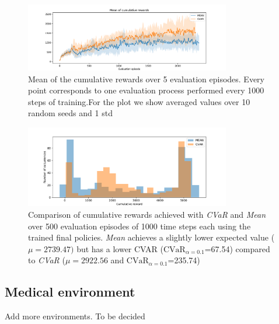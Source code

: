 \begin{figure}[ht]
\centering
\includegraphics[width=0.8\textwidth]{images/Walker_offpolicy_expert/mean_train_withstds.pdf}
\caption{Mean of the cumulative rewards over 5 evaluation episodes. Every point corresponds
to one evaluation process performed every 1000 steps of training.For the plot we
show averaged values over 10 random seeds and 1 std}
\label{fig:mean_walker}

\end{figure}



\begin{figure}[ht]
\centering
\includegraphics[width=0.8\textwidth]{images/Walker_offpolicy_expert/hist_evaluation_numevalsteps1000.pdf}
\caption{Comparison of cumulative rewards achieved with \textit{CVaR} and \textit{Mean}
over 500 evaluation episodes of 1000 time steps each using the trained final policies.
\textit{Mean} achieves a slightly lower expected value ($\mu=2739.47)$ but 
has a lower CVAR ($\text{CVaR}_{\alpha= 0.1}$=67.54) compared to
\textit{CVaR} ($\mu=2922.56$ and $\text{CVaR}_{\alpha= 0.1}$=235.74)}
\label{fig:hist_cum_rewards_walker}
\end{figure}

\clearpage
\subsection{Medical environment}
Add more environments. To be decided